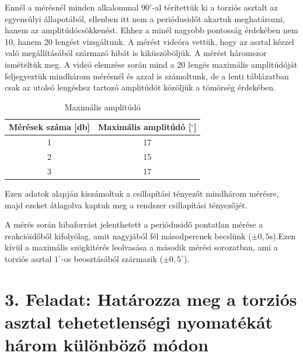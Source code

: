 \documentclass{article}
\begin{document}
Ennél a mérésnél minden alkalommal $90^\circ$-al térítettük ki a torziós asztalt az egyensúlyi állapotából, ellenben itt nem a periódusidőt akartuk meghatározni, hanem az amplitúdócsökkenést. Ehhez a minél nagyobb pontosság érdekében nem 10, hanem 20 lengést vizsgáltunk. A mérést videóra vettük, hogy az asztal kézzel való megállításából származó hibát is kiküszöböljük. A mérést háromszor ismételtük meg. A videó elemzése során mind a 20 lengés maximális amplitúdóját feljegyeztük mindhárom mérésnél és azzal is számoltunk, de a lenti táblázatban csak az utolsó lengéshez tartozó amplitúdót közöljük a tömörség érdekében.


\begin{table}[H]
    \centering
    \begin{tabular}{|c|c|}
        \hline
        Mérések száma [db] & Maximális amplitúdó [$^\circ$] \\ \hline
        1                  & 17                             \\ \hline 
        2                  & 15                             \\ \hline
        3                  & 17                             \\ \hline 
    \end{tabular}
    \caption{Maximális amplitúdó}
    \label{tab:max_amplitudo}
\end{table}

Ezen adatok alapján kiszámoltuk a csillapítási tényezőt mindhárom mérésre, majd ezeket átlagolva kaptuk meg a rendszer csillapítási tényezőjét.

A mérés során hibaforrást jelenthetett a periódusidő pontatlan mérése a reakcióidőből kifolyólag, amit nagyjából fél másodpercnek becslünk ($\pm 0,5 \text{s}$).Ezen kívül a maximális szögkitérés leolvasása a második mérési sorozatban, ami a torziós asztal $1^\circ$-os beosztásából származik ($\pm 0,5^\circ$). 


\newpage

\section*{3. Feladat: Határozza meg a torziós asztal tehetetlenségi nyomatékát három különböző módon}
\end{document}
